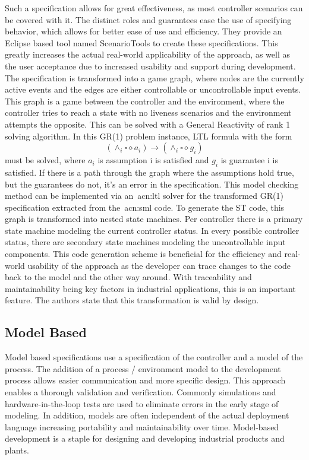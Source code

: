 Such a specification allows for great effectiveness, as most controller scenarios can be covered with it.
The distinct roles and guarantees ease the use of specifying behavior, which allows for better ease of use and efficiency.
They provide an Eclipse based tool named ScenarioTools to create these specifications.
This greatly increases the actual real-world applicability of the approach, as well as the user acceptance due to increased usability and support during development.
The specification is transformed into a game graph, where nodes are the currently active events and the edges are either controllable or uncontrollable input events.
This graph is a game between the controller and the environment, where the controller tries to reach a state with no liveness scenarios and the environment attempts the opposite.
This can be solved with a General Reactivity of rank 1 solving algorithm.
In this GR(1) problem instance, LTL formula with the form
\begin{equation}
\left(\land_{i}\square\diamond a_{i} \right) \rightarrow \left(\land_{i}\square\diamond g_{i} \right)
\end{equation}
must be solved, where $a_{i}$ is assumption i is satisfied and $g_{i}$ is guarantee i is satisfied.
If there is a path through the graph where the assumptions hold true, but the guarantees do not, it's an error in the specification.
This model checking method can be implemented via an~\acrshort{acn:ltl} solver for the transformed GR(1) specification extracted from the~\acrshort{acn:sml} code.
To generate the ST code, this graph is transformed into nested state machines.
Per controller there is a primary state machine modeling the current controller status.
In every possible controller status, there are secondary state machines modeling the uncontrollable input components.
This code generation scheme is beneficial for the efficiency and real-world usability of the approach as the developer can trace changes to the code back to the model and the other way around.
With traceability and maintainability being key factors in industrial applications, this is an important feature.
The authors state that this transformation is valid by design.


\subsection{Model Based}
\label{sec:sub:mb}

Model based specifications use a specification of the controller and a model of the process.
The addition of a process / environment model to the development process allows easier communication and more specific design.
This approach enables a thorough validation and verification.
Commonly simulations and hardware-in-the-loop tests are used to eliminate errors in the early stage of modeling.
In addition, models are often independent of the actual deployment language increasing portability and maintainability over time.
Model-based development is a staple for designing and developing industrial products and plants.


